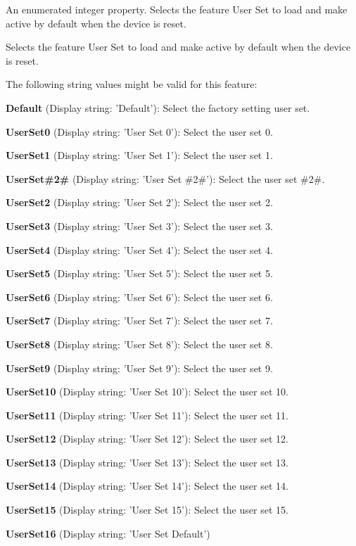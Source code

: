 An enumerated integer property. Selects the feature User Set to load and make active by default when the device is reset. 

Selects the feature User Set to load and make active by default when the device is reset.

The following string values might be valid for this feature\+:
\begin{DoxyItemize}
\item {\bfseries Default} (Display string\+: 'Default')\+: Select the factory setting user set.
\item {\bfseries User\+Set0} (Display string\+: 'User Set 0')\+: Select the user set 0.
\item {\bfseries User\+Set1} (Display string\+: 'User Set 1')\+: Select the user set 1.
\item {\bfseries User\+Set\#2\#} (Display string\+: 'User Set \#2\#')\+: Select the user set \#2\#.
\item {\bfseries User\+Set2} (Display string\+: 'User Set 2')\+: Select the user set 2.
\item {\bfseries User\+Set3} (Display string\+: 'User Set 3')\+: Select the user set 3.
\item {\bfseries User\+Set4} (Display string\+: 'User Set 4')\+: Select the user set 4.
\item {\bfseries User\+Set5} (Display string\+: 'User Set 5')\+: Select the user set 5.
\item {\bfseries User\+Set6} (Display string\+: 'User Set 6')\+: Select the user set 6.
\item {\bfseries User\+Set7} (Display string\+: 'User Set 7')\+: Select the user set 7.
\item {\bfseries User\+Set8} (Display string\+: 'User Set 8')\+: Select the user set 8.
\item {\bfseries User\+Set9} (Display string\+: 'User Set 9')\+: Select the user set 9.
\item {\bfseries User\+Set10} (Display string\+: 'User Set 10')\+: Select the user set 10.
\item {\bfseries User\+Set11} (Display string\+: 'User Set 11')\+: Select the user set 11.
\item {\bfseries User\+Set12} (Display string\+: 'User Set 12')\+: Select the user set 12.
\item {\bfseries User\+Set13} (Display string\+: 'User Set 13')\+: Select the user set 13.
\item {\bfseries User\+Set14} (Display string\+: 'User Set 14')\+: Select the user set 14.
\item {\bfseries User\+Set15} (Display string\+: 'User Set 15')\+: Select the user set 15.
\item {\bfseries User\+Set16} (Display string\+: 'User Set Default')
\end{DoxyItemize}


